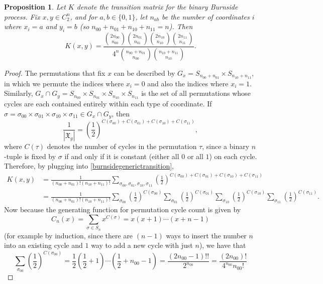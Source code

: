 \documentclass[11pt]{article}
\newcommand{\mf}{\mathfrak}
\newcounter{r}
\newcounter{s}
\numberwithin{equation}{section}
\newtheorem{proposition}[theorem]{Proposition}
\begin{document}
\begin{proposition}\label{closedformk}
Let $K$ denote the transition matrix for the binary Burnside process. Fix $x, y \in C_2^n$, and for $a, b \in \{0, 1\}$, let $n_{ab}$ be the number of coordinates $i$ where $x_i = a$ and $y_i = b$ (so $n_{00} + n_{01} + n_{10} + n_{11} = n$). Then 
\[
    K(x, y) = \frac{\binom{2n_{00}}{n_{00}} \binom{2n_{01}}{n_{01}} \binom{2n_{10}}{n_{10}} \binom{2n_{11}}{n_{11}}}{4^n\binom{n_{00} + n_{01}}{n_{00}}\binom{n_{10} + n_{11}}{n_{10}}}.
\]
\end{proposition}
\begin{proof}
The permutations that fix $x$ can be described by $G_x = S_{n_{00} + n_{01}} \times S_{n_{10} + n_{11}}$, in which we permute the indices where $x_i = 0$ and also the indices where $x_i = 1$. Similarly, $G_x \cap G_y = S_{n_{00}} \times S_{n_{01}} \times S_{n_{10}} \times S_{n_{11}}$ is the set of all permutations whose cycles are each contained entirely within each type of coordinate. If $\sigma = \sigma_{00} \times \sigma_{01} \times \sigma_{10} \times \sigma_{11} \in G_x \cap G_y$, then
\[
    \frac{1}{|\mf{X}_g|} = \left(\frac{1}{2}\right)^{C(\sigma_{00}) + C(\sigma_{01}) + C(\sigma_{10}) + C(\sigma_{11})},
\]
where $C(\tau)$ denotes the number of cycles in the permutation $\tau$, since a binary $n$-tuple is fixed by $\sigma$ if and only if it is constant (either all $0$ or all $1$) on each cycle. Therefore, by plugging into \cref{burnsidegenerictransition},
\begin{align*}
    K(x, y) &= \frac{1}{(n_{00} + n_{01})! (n_{10} + n_{11})!} \sum_{\sigma_{00}, \sigma_{01}, \sigma_{10}, \sigma_{11}}\left(\frac{1}{2}\right)^{C(\sigma_{00}) + C(\sigma_{01}) + C(\sigma_{10}) + C(\sigma_{11})} \\
    &= \frac{1}{(n_{00} + n_{01})! (n_{10} + n_{11})!} \sum_{\sigma_{00}} \left(\frac{1}{2}\right)^{C(\sigma_{00})} \sum_{\sigma_{01}} \left(\frac{1}{2}\right)^{C(\sigma_{01})} \sum_{\sigma_{10}} \left(\frac{1}{2}\right)^{C(\sigma_{10})} \sum_{\sigma_{11}} \left(\frac{1}{2}\right)^{C(\sigma_{11})}.
\end{align*}
Now because the generating function for permutation cycle count is given by
\[
    C_n(x) = \sum_{\sigma \in S_n} x^{C(\sigma)} = x(x+1)\cdots(x+n-1)
\]
(for example by induction, since there are $(n-1)$ ways to insert the number $n$ into an existing cycle and $1$ way to add a new cycle with just $n$), we have that 
\[
    \sum_{\sigma_{00}} \left(\frac{1}{2}\right)^{C(\sigma_{00})} = \frac{1}{2} \left(\frac{1}{2} + 1\right) \cdots \left(\frac{1}{2} + n_{00} - 1\right) = \frac{(2n_{00}-1)!!}{2^{n_{00}}} = \frac{(2n_{00})!}{4^{n_{00}} n_{00}!}
\]
\end{proof}
\end{document}
